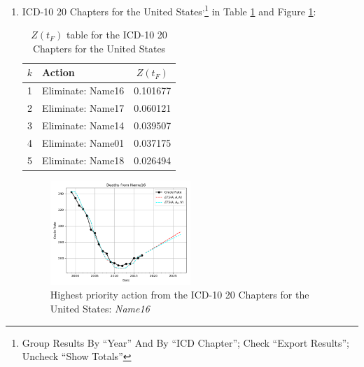 \documentclass[12pt, a4paper, twocolumn]{article}
\begin{document}
\begin{enumerate}
  \item ICD-10 20 Chapters for the United States\cite{centers2017underlying}\textsuperscript{,}\footnote{Group Results By \enquote{Year} And By \enquote{ICD Chapter}; Check \enquote{Export Results}; Uncheck \enquote{Show Totals}} in Table \ref{table:ztable5} and Figure \ref{fig:k5}:
    \begin{table}[H]
      \centering
      \begin{tabular}{clc}
        \toprule
          $k$ & Action            & $Z(t_F)$ \\
        \midrule
          1   & Eliminate: Name16 & 0.101677 \\
          2   & Eliminate: Name17 & 0.060121 \\
          3   & Eliminate: Name14 & 0.039507 \\
          4   & Eliminate: Name01 & 0.037175 \\
          5   & Eliminate: Name18 & 0.026494 \\
        \bottomrule
      \end{tabular}
      \caption{$Z(t_F)$ table for the ICD-10 20 Chapters for the United States}
      \label{table:ztable5}
    \end{table}
    \begin{figure}[H]
      \centering
      \includegraphics[width=0.5\textwidth]{results/US_ICD10_CHAPTERS/Name16_ets.png}
      \caption{Highest priority action from the ICD-10 20 Chapters for the United States: \textit{Name16}}\label{fig:k5}
    \end{figure}
  

\end{enumerate}
\end{document}
